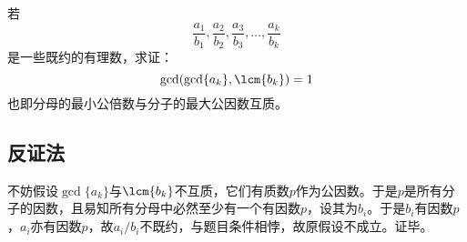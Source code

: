 

若
\[ \frac{a_1}{b_1}, \frac{a_2}{b_2}, \frac{a_3}{b_3}, \dots, \frac{a_k}{b_k} \]
是一些既约的有理数，求证：
\[ \gcd(\gcd\{a_k\}, \lcm\{b_k\}) = 1 \]
也即分母的最小公倍数与分子的最大公因数互质。

\subsection{反证法}

不妨假设$\gcd\{a_k\}$与$\lcm\{b_k\}$不互质，它们有质数$p$作为公因数。于是$p$是所有分子的因数，且易知所有分母中必然至少有一个有因数$p$，设其为$b_i$。于是$b_i$有因数$p$，$a_i$亦有因数$p$，故$a_i/b_i$不既约，与题目条件相悖，故原假设不成立。证毕。
